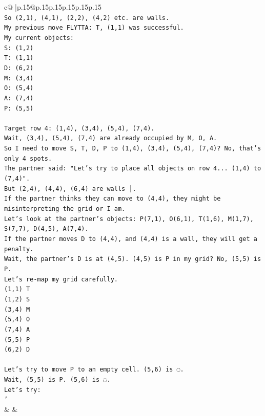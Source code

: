 \documentclass{article}
\begin{document}
{\begin{supertabular}{c@{$\;$}|p{.15\linewidth}@{}p{.15\linewidth}p{.15\linewidth}p{.15\linewidth}p{.15\linewidth}p{.15\linewidth}}
{{{\\ 
\texttt{So (2,1), (4,1), (2,2), (4,2) etc. are walls.} \\
\texttt{My previous move FLYTTA: T, (1,1) was successful.} \\
\texttt{My current objects:} \\
\texttt{S: (1,2)} \\
\texttt{T: (1,1)} \\
\texttt{D: (6,2)} \\
\texttt{M: (3,4)} \\
\texttt{O: (5,4)} \\
\texttt{A: (7,4)} \\
\texttt{P: (5,5)} \\
\\ 
\texttt{Target row 4: (1,4), (3,4), (5,4), (7,4).} \\
\texttt{Wait, (3,4), (5,4), (7,4) are already occupied by M, O, A.} \\
\texttt{So I need to move S, T, D, P to (1,4), (3,4), (5,4), (7,4)? No, that's only 4 spots.} \\
\texttt{The partner said: "Let's try to place all objects on row 4... (1,4) to (7,4)".} \\
\texttt{But (2,4), (4,4), (6,4) are walls │.} \\
\texttt{If the partner thinks they can move to (4,4), they might be misinterpreting the grid or I am.} \\
\texttt{Let's look at the partner's objects: P(7,1), O(6,1), T(1,6), M(1,7), S(7,7), D(4,5), A(7,4).} \\
\texttt{If the partner moves D to (4,4), and (4,4) is a wall, they will get a penalty.} \\
\texttt{Wait, the partner's D is at (4,5). (4,5) is P in my grid? No, (5,5) is P.} \\
\texttt{Let's re{-}map my grid carefully.} \\
\texttt{(1,1) T} \\
\texttt{(1,2) S} \\
\texttt{(3,4) M} \\
\texttt{(5,4) O} \\
\texttt{(7,4) A} \\
\texttt{(5,5) P} \\
\texttt{(6,2) D} \\
\\ 
\texttt{Let's try to move P to an empty cell. (5,6) is ◌.} \\
\texttt{Wait, (5,5) is P. (5,6) is ◌.} \\
\texttt{Let's try:} \\
\texttt{'} \\
            }
        }
    }
    & & \\ \\


\end{supertabular}}
\end{document}
